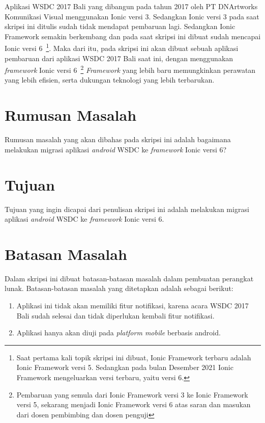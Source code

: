 Aplikasi WSDC 2017 Bali yang dibangun pada tahun 2017 oleh PT DNArtworks Komunikasi Visual menggunakan Ionic versi 3. Sedangkan Ionic versi 3 pada saat skripsi ini ditulis sudah tidak mendapat pembaruan lagi. Sedangkan Ionic Framework semakin berkembang dan pada saat skripsi ini dibuat sudah mencapai Ionic versi 6~\footnote{Saat pertama kali topik skripsi ini dibuat, Ionic Framework terbaru adalah Ionic Framework versi 5. Sedangkan pada bulan Desember 2021 Ionic Framework mengeluarkan versi terbaru, yaitu versi 6.}. Maka dari itu, pada skripsi ini akan dibuat sebuah aplikasi pembaruan dari aplikasi WSDC 2017 Bali saat ini, dengan menggunakan \textit{framework} Ionic versi 6~\footnote{Pembaruan yang semula dari Ionic Framework versi 3 ke Ionic Framework versi 5, sekarang menjadi Ionic Framework versi 6 atas saran dan masukan dari dosen pembimbing dan dosen penguji} \textit{Framework} yang lebih baru memungkinkan perawatan yang lebih efisien, serta dukungan teknologi yang lebih terbarukan.

\section{Rumusan Masalah}
\label{sec:rumusan}
Rumusan masalah yang akan dibahas pada skripsi ini adalah bagaimana melakukan migrasi aplikasi {\it android} WSDC ke {\it framework} Ionic versi 6?


\section{Tujuan}
\label{sec:tujuan}
Tujuan yang ingin dicapai dari penulisan skripsi ini adalah melakukan migrasi aplikasi {\it android} WSDC ke {\it framework} Ionic versi 6.

\section{Batasan Masalah}
\label{sec:batasan}
Dalam skripsi ini dibuat batasan-batasan masalah dalam pembuatan perangkat lunak.  Batasan-batasan masalah yang ditetapkan adalah sebagai berikut:

\begin{enumerate}
    \item Aplikasi ini tidak akan memiliki fitur notifikasi, karena acara WSDC 2017 Bali sudah selesai dan tidak diperlukan kembali fitur notifikasi.
    \item Aplikasi hanya akan diuji pada \textit{platform mobile} berbasis android. 
\end{enumerate}


